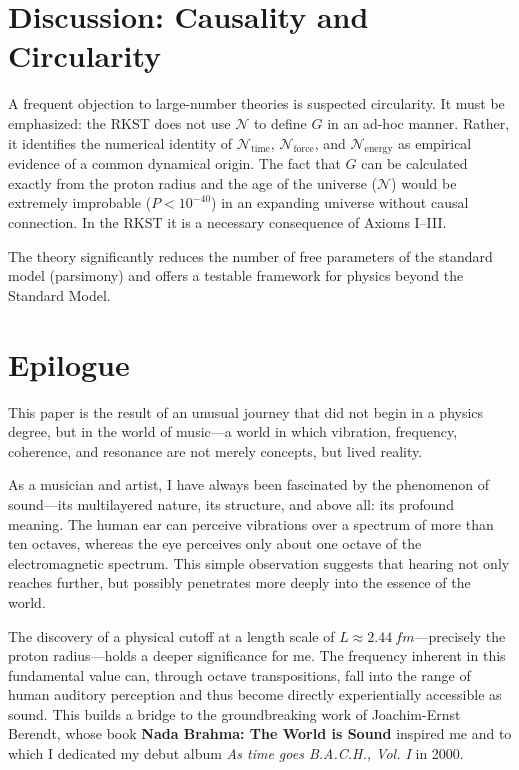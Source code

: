 \documentclass[11pt,a4paper]{article}
\begin{document}
\section{Discussion: Causality and Circularity}
\label{sec:discussion}

A frequent objection to large-number theories is suspected circularity. It must be emphasized: the RKST does not use $\mathcal{N}$ to define $G$ in an ad-hoc manner. Rather, it identifies the numerical identity of $\mathcal{N}_{\text{time}}$, $\mathcal{N}_{\text{force}}$, and $\mathcal{N}_{\text{energy}}$ as empirical evidence of a common dynamical origin.  
The fact that $G$ can be calculated exactly from the proton radius and the age of the universe ($\mathcal{N}$) would be extremely improbable ($P < 10^{-40}$) in an expanding universe without causal connection. In the RKST it is a necessary consequence of Axioms I–III.

The theory significantly reduces the number of free parameters of the standard model (parsimony) and offers a testable framework for physics beyond the Standard Model.

\section*{Epilogue}

This paper is the result of an unusual journey that did not begin in a physics degree, but in the world of music—a world in which vibration, frequency, coherence, and resonance are not merely concepts, but lived reality.

As a musician and artist, I have always been fascinated by the phenomenon of sound—its multilayered nature, its structure, and above all: its profound meaning. The human ear can perceive vibrations over a spectrum of more than ten octaves, whereas the eye perceives only about one octave of the electromagnetic spectrum. This simple observation suggests that hearing not only reaches further, but possibly penetrates more deeply into the essence of the world.

The discovery of a physical cutoff at a length scale of $L \approx \SI{2.44}{fm}$—precisely the proton radius—holds a deeper significance for me. The frequency inherent in this fundamental value can, through octave transpositions, fall into the range of human auditory perception and thus become directly experientially accessible as sound. This builds a bridge to the groundbreaking work of Joachim-Ernst Berendt, whose book \textbf{Nada Brahma: The World is Sound} inspired me and to which I dedicated my debut album \textit{As time goes B.A.C.H., Vol. I} in 2000.
\end{document}

